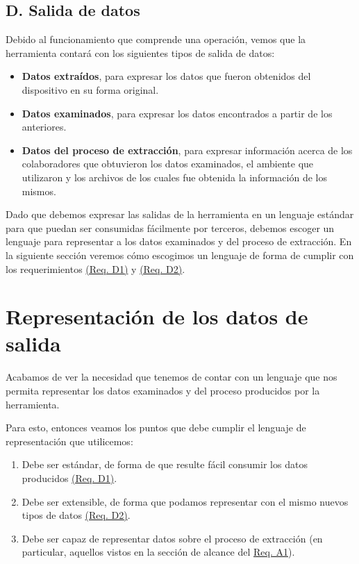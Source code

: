 \subsection*{D. Salida de datos}
Debido al funcionamiento que comprende una operación, vemos que la herramienta contará con los siguientes tipos de salida de datos:

\begin{itemize}
\item \textbf{Datos extraídos}, para expresar los datos que fueron obtenidos del dispositivo en su forma original.
\item \textbf{Datos examinados}, para expresar los datos encontrados a partir de los anteriores.
\item \textbf{Datos del proceso de extracción}, para expresar información acerca de los colaboradores que obtuvieron los datos examinados, el ambiente que utilizaron y los archivos de los cuales fue obtenida la información de los mismos.
\end{itemize}

Dado que debemos expresar las salidas de la herramienta en un lenguaje estándar para que puedan ser consumidas fácilmente por terceros, debemos escoger un lenguaje para representar a los datos examinados y del proceso de extracción. En la siguiente sección veremos cómo escogimos un lenguaje de forma de cumplir con los requerimientos \hyperref[reqD1]{(Req. D1)} y \hyperref[reqD2]{(Req. D2)}.

\section{Representación de los datos de salida}
Acabamos de ver la necesidad que tenemos de contar con un lenguaje que nos permita representar los datos examinados y del proceso producidos por la herramienta.

Para esto, entonces veamos los puntos que debe cumplir el lenguaje de representación que utilicemos:

\begin{enumerate}[topsep=0pt, parsep=0pt, partopsep=0pt]
\item Debe ser estándar, de forma de que resulte fácil consumir los datos producidos \hyperref[reqD1]{(Req. D1)}.
\item Debe ser extensible, de forma que podamos representar con el mismo nuevos tipos de datos \hyperref[reqD2]{(Req. D2)}.
\item Debe ser capaz de representar datos sobre el proceso de extracción (en particular, aquellos vistos en la sección de alcance del \hyperref[reqA1]{Req. A1}).
\end{enumerate}

